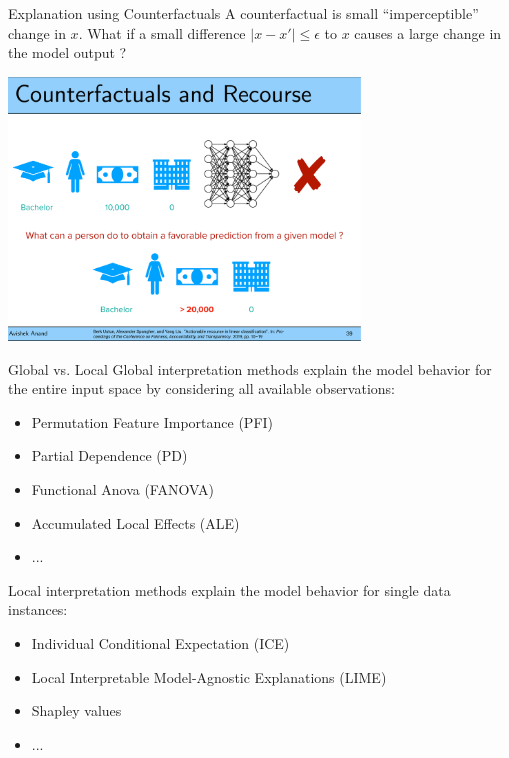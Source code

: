 \documentclass[11pt,compress,t,notes=noshow, aspectratio=169, xcolor=table]{beamer}
\begin{document}
\begin{frame}{Explanation using Counterfactuals}
    A counterfactual is small ``imperceptible'' change in $x$. What if a small difference $ |x - x'| \leq \epsilon$ to $x$ causes a large change in the model output ?
	\begin{center}
	\includegraphics[page=1, width=0.7\textwidth]{figure/counterfactual.pdf}
	\end{center}

\end{frame}


\begin{frame}{Global vs. Local}
Global interpretation methods explain the model behavior for the entire input space by considering all available observations:
	\begin{itemize}
		\item Permutation Feature Importance (PFI)
		\item Partial Dependence (PD)
		\item Functional Anova (FANOVA)
		\item Accumulated Local Effects (ALE)
		\item ...
	\end{itemize}
\bigskip
Local interpretation methods explain the model behavior for single data instances:
	\begin{itemize}
		\item Individual Conditional Expectation (ICE)
		\item Local Interpretable Model-Agnostic Explanations (LIME)
		\item Shapley values
		\item ...
	\end{itemize}
\end{frame}
\end{document}
